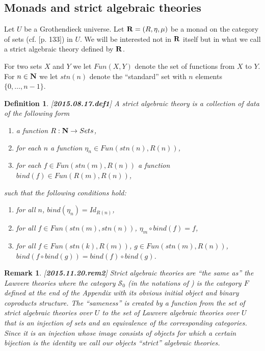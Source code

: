 \documentclass[11pt]{article}
\newtheorem{definition}[proposition]{Definition}
\newtheorem{remark}[proposition]{Remark}
\newcommand{\llabel}[1]{\label{#1}[{\bf #1}]}
\newcommand{\sr}{\rightarrow}
\newcommand{\nn}{{\bf N\rm}}
\newcommand{\nat}{\nn}
\newcommand{\bind}{bind}
\begin{document}
\subsection{Monads and strict algebraic theories}
%

Let $U$ be a Grothendieck universe. Let ${\bf R}=(R,\eta,\mu)$ be a monad on the category of sets (cf. \cite{MacLane}[p. 133]) in $U$. We will be interested not in ${\bf R}$ itself but in what we call a strict algebraic theory defined by ${\bf R}$. 

For two sets $X$ and $Y$ we let $Fun(X,Y)$ denote the set of functions from $X$ to $Y$. For $n\in\nat$ we let $stn(n)$ denote the ``standard'' set with $n$ elements $\{0,\dots,n-1\}$.
% 
\begin{definition}
\llabel{2015.08.17.def1}
A strict algebraic theory is a collection of data of the following form
%
\begin{enumerate}
\item a function $R:\nn\sr Sets$,
\item for each $n$ a function $\eta_{n}\in Fun(stn(n),R(n))$,
\item for each $f\in Fun(stn(m),R(n))$ a function $\bind(f)\in Fun(R(m),R(n))$,
\end{enumerate}
%
such that the following conditions hold:
%
\begin{enumerate}
\item for all $n$, $\bind(\eta_n)=Id_{R(n)}$,
\item for all $f\in Fun(stn(m),stn(n))$, $\eta_m\circ \bind(f)=f$,
\item for all $f\in Fun(stn(k),R(m))$, $g\in Fun(stn(m),R(n))$, $\bind(f\circ \bind(g))=\bind(f)\circ \bind(g)$.
\end{enumerate}
%
\end{definition}
%
\begin{remark}\rm
\llabel{2015.11.20.rem2}
Strict algebraic theories are ``the same as'' the Lawvere theories where the category ${\mathcal S}_0$ (in the notations of \cite{Lawvere}) is the category $F$ defined at the end of the Appendix with its obvious initial object and binary coproducts structure. The ``sameness'' is created by a function from the set of strict algebraic theories over $U$ to the set of Lawvere algebraic theories over $U$ that is an injection of sets and an equivalence of the corresponding categories. Since it is an injection whose image consists of objects for which a certain bijection is the identity we call our objects ``strict'' algebraic theories. 
\end{remark}
\end{document}
